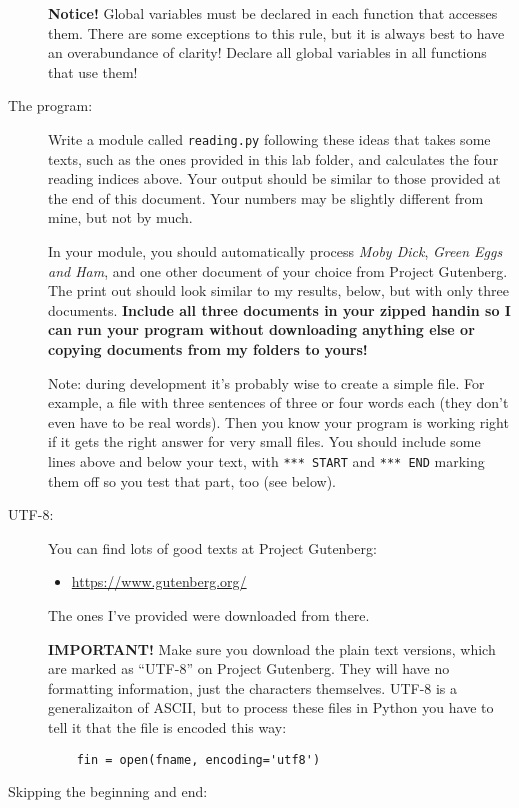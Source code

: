 \documentclass[12pt]{article}
\begin{document}
\begin{description}
{\bf Notice!}  Global variables must be declared in each
function that accesses them.  There are some exceptions
to this rule, but it is always best to have an overabundance of
clarity!  Declare all global variables in all functions that use them!

\item[The program:] Write a module called {\tt reading.py}
following these ideas
that takes some texts, such as the ones provided in this lab
folder, and calculates the four reading indices above.  Your
output should be similar to those provided at the end of this 
document.  Your numbers may be slightly different from mine,
but not by much.

In your module, you should automatically process {\em Moby Dick},
{\em Green Eggs and Ham}, and one other document of your
choice from Project Gutenberg. The print out should 
look similar
to my results, below, but with only three documents.  
{\bf Include all three documents
in your zipped handin so I can run
your program without downloading anything else or copying
documents from my folders to yours!}

 Note:  during development it's probably wise to create a simple
file.  For example, a file with three sentences of three or four words
each (they don't even have to be real words).  Then you know your
program is working right if it gets the right answer for very small files.
You should include some lines above and below your text, with
\lstinline{*** START} and \lstinline{*** END} marking them off so
you test that part, too (see below).


\item[UTF-8:]  You can find lots of good texts at Project Gutenberg:
\begin{itemize}
\item \url{https://www.gutenberg.org/}
\end{itemize}
The ones I've provided were downloaded from there.

{\bf IMPORTANT!}  Make sure you download the plain text versions,
which are marked as ``UTF-8'' on Project Gutenberg.  They will have
no formatting information, just the characters themselves.  UTF-8
is a generalizaiton of ASCII, but to process these files in Python
you have to tell it that the file is encoded this way:
\begin{lstlisting}
    fin = open(fname, encoding='utf8')
\end{lstlisting}

\item[Skipping the beginning and end:]~


\end{description}
\end{document}
